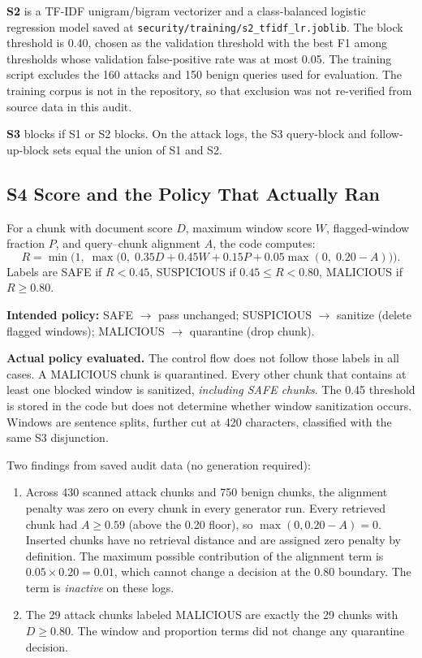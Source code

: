 \documentclass[journal]{IEEEtran}
\begin{document}
\textbf{S2} is a TF-IDF unigram/bigram vectorizer and a class-balanced logistic
regression model saved at \texttt{security/training/s2\_tfidf\_lr.joblib}. The
block threshold is 0.40, chosen as the validation threshold with the best F1
among thresholds whose validation false-positive rate was at most 0.05. The
training script excludes the 160 attacks and 150 benign queries used for
evaluation. The training corpus is not in the repository, so that exclusion was
not re-verified from source data in this audit.

\textbf{S3} blocks if S1 or S2 blocks. On the attack logs, the S3 query-block
and follow-up-block sets equal the union of S1 and S2.

\subsection{S4 Score and the Policy That Actually Ran}
\label{sec:s4impl}

For a chunk with document score $D$, maximum window score $W$, flagged-window
fraction $P$, and query--chunk alignment $A$, the code computes:
\begin{equation}
  R = \min\!\bigl(1,\;\max\!\bigl(0,\;0.35D + 0.45W + 0.15P
      + 0.05\max(0,\;0.20 - A)\bigr)\bigr).
  \label{eq:risk}
\end{equation}
Labels are SAFE if $R < 0.45$, SUSPICIOUS if $0.45 \le R < 0.80$, MALICIOUS if
$R \ge 0.80$.

\textbf{Intended policy:} SAFE $\to$ pass unchanged; SUSPICIOUS $\to$ sanitize
(delete flagged windows); MALICIOUS $\to$ quarantine (drop chunk).

\textbf{Actual policy evaluated.} The control flow does not follow those labels
in all cases. A MALICIOUS chunk is quarantined. Every other chunk that contains
at least one blocked window is sanitized, \emph{including SAFE chunks}. The 0.45
threshold is stored in the code but does not determine whether window
sanitization occurs. Windows are sentence splits, further cut at 420 characters,
classified with the same S3 disjunction.

Two findings from saved audit data (no generation required):
\begin{enumerate}
\item Across 430 scanned attack chunks and 750 benign chunks, the alignment
  penalty was zero on every chunk in every generator run. Every retrieved chunk
  had $A \ge 0.59$ (above the 0.20 floor), so $\max(0, 0.20 - A) = 0$.
  Inserted chunks have no retrieval distance and are assigned zero penalty by
  definition. The maximum possible contribution of the alignment term is
  $0.05 \times 0.20 = 0.01$, which cannot change a decision at the 0.80
  boundary. The term is \emph{inactive} on these logs.

\item The 29 attack chunks labeled MALICIOUS are exactly the 29 chunks with
  $D \ge 0.80$. The window and proportion terms did not change any quarantine
  decision.
\end{enumerate}
\end{document}
